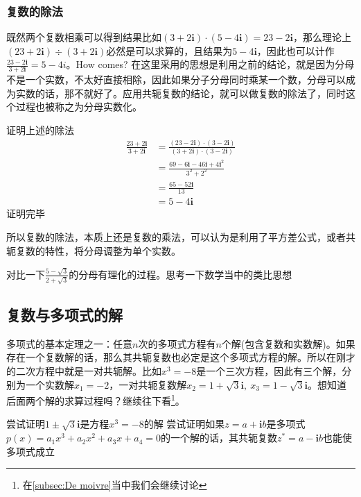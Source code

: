 \subsubsection*{复数的除法}
既然两个复数相乘可以得到结果比如$(3+2\mathbf{i})\cdot (5-4\mathbf{i})=23-2\mathbf{i}$，那么理论上$(23+2\mathbf{i})\div(3+2\mathbf{i})$必然是可以求算的，且结果为$5-4\mathbf{i}$，因此也可以计作$\frac{23-2\mathbf{i}}{3+2\mathbf{i}}=5-4i$。How comes?
在这里采用的思想是利用之前的结论，就是因为分母不是一个实数，不太好直接相除，因此如果分子分母同时乘某一个数，分母可以成为实数的话，那不就好了。应用共轭复数的结论，就可以做复数的除法了，同时这个过程也被称之为分母实数化。
\begin{ExampleBox}
证明上述的除法
\tcblower
\begin{align*}
	\frac{23+2\mathbf{i}}{3+2\mathbf{i}} &= \frac{(23-2\mathbf{i})\cdot (3-2\mathbf{i})}{(3+2\mathbf{i})\cdot(3-2\mathbf{i})}\\
					   &=\frac{69-6\mathbf{i}-46\mathbf{i}+4\mathbf{i}^2}{3^2+2^2}\\
					   &=\frac{65-52\mathbf{i}}{13}\\
					   &=5-4\mathbf{i}
\end{align*}
证明完毕
\end{ExampleBox}
所以复数的除法，本质上还是复数的乘法，可以认为是利用了平方差公式，或者共轭复数的特性，将分母调整为单个实数。

\begin{TaskBox}
 对比一下$\frac{5-\sqrt 3}{2+\sqrt 3}$的分母有理化的过程。思考一下数学当中的类比思想
\end{TaskBox}

\subsection*{复数与多项式的解}
\label{subsec:polysolution}
多项式的基本定理之一：任意$n$次的多项式方程有$n$个解(包含复数和实数解)。如果存在一个复数解的话，那么其共轭复数也必定是这个多项式方程的解。所以在刚才的二次方程中就是一对共轭解。比如$x^3=-8$是一个三次方程，因此有三个解，分别为一个实数解$x_1=-2$，一对共轭复数解$x_2=1+\sqrt 3 \mathbf{i}, \ x_3=1-\sqrt 3 \mathbf{i}$。想知道后面两个解的求算过程吗？继续往下看\footnote{在\ref{subsec:De moivre}当中我们会继续讨论}。

\begin{TaskBox}
 尝试证明$1\pm \sqrt3 \mathbf{i}$是方程$x^3=-8$的解
 \tcblower
 尝试证明如果$z=a+\mathbf{i} b$是多项式$p(x)=a_1x^3+a_2x^2+a_3x+a_4=0$的一个解的话，其共轭复数$z^*=a-\mathbf{i} b$也能使多项式成立
\end{TaskBox}
\clearpage

